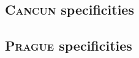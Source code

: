 \subsection{\textsc{Cancun} specificities}     \label{txn data: fork specificities: cancun}    
\subsection{\textsc{Prague} specificities}     \label{txn data: fork specificities: prague}     %


